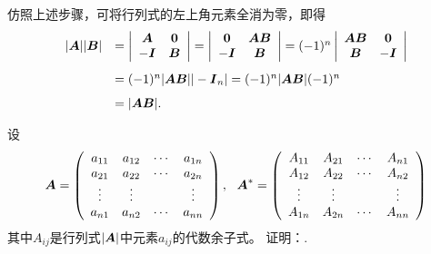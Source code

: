 \begin{frame}   
  仿照上述步骤，可将行列式的左上角元素全消为零，即得
  $$
  \begin{array}{rl}
    |\MA||\MB| &  = \left|
               \begin{array}{cc}
                 \MA & \M0\\
                 -\MI & \MB
               \end{array}
                        \right|  = \left|
                        \begin{array}{cc}
                          \M0 & \MA\MB \\
                          -\MI & \MB
                        \end{array}
                                 \right| = (-1)^n\left|
                                 \begin{array}{cc}
                                   \MA\MB & \M0\\
                                   \MB   & -\MI
                                 \end{array}
                                          \right| \\[0.2in]
             &  = (-1)^n |\MA\MB||-\MI_n|  = (-1)^n |\MA\MB|(-1)^n \\[0.1in]
             &  = |\MA\MB|.  
  \end{array}
  $$
\end{frame}

\begin{frame}
\begin{li}
  设
  $$
  \boldsymbol{A} = \left(
    \begin{array}{cccc}
      a_{11} & a_{12} & \cdots & a_{1n} \\
      a_{21} & a_{22} & \cdots & a_{2n} \\
      \vdots   & \vdots   &     & \vdots   \\
      a_{n1} & a_{n2} & \cdots & a_{nn} \\
    \end{array}
  \right), ~~
  \boldsymbol{A}^* = \left(
    \begin{array}{cccc}
      A_{11} & A_{21} & \cdots & A_{n1} \\
      A_{12} & A_{22} & \cdots & A_{n2} \\
      \vdots   & \vdots   &     & \vdots   \\
      A_{1n} & A_{2n} & \cdots & A_{nn} \\
    \end{array}
  \right)
  $$
  其中$A_{ij}$是行列式$|\boldsymbol{A}|$中元素$a_{ij}$的代数余子式。
  证明：.      
\end{li}
\end{frame}

